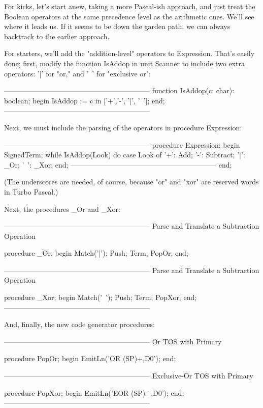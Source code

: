 \documentclass[float=false, crop=false]{standalone}
\begin{document}
For kicks, let's start anew, taking a more Pascal-ish approach, and just treat
the Boolean operators at the same precedence level as the arithmetic ones. We'll
see where it leads us. If it seems to be down the garden path, we can always
backtrack to the earlier approach.

For starters, we'll add the "addition-level" operators to Expression. That's
easily done; first, modify the function IsAddop in unit Scanner to include two
extra operators: '|' for "or," and '~' for "exclusive or":

\begin{code}
{--------------------------------------------------------------}
function IsAddop(c: char): boolean;
begin
	IsAddop := c in ['+','-', '|', '~'];
end;
{--------------------------------------------------------------}
\end{code}

Next, we must include the parsing of the operators in procedure Expression:

\begin{code}
{--------------------------------------------------------------}
procedure Expression;
begin
	SignedTerm;
	while IsAddop(Look) do
		case Look of
			'+': Add;
			'-': Subtract;
			'|': _Or;
			'~': _Xor;
		end;
{--------------------------------------------------------------}
end;
\end{code}

(The underscores are needed, of course, because "or" and "xor" are reserved
words in Turbo Pascal.)

Next, the procedures _Or and _Xor:

\begin{code}
{--------------------------------------------------------------}
{ Parse and Translate a Subtraction Operation }

procedure _Or;
begin
	Match('|');
	Push;
	Term;
	PopOr;
end;

{--------------------------------------------------------------}
{ Parse and Translate a Subtraction Operation }

procedure _Xor;
begin
	Match('~');
	Push;
	Term;
	PopXor;
end;
{--------------------------------------------------------------}
\end{code}

And, finally, the new code generator procedures:

\begin{code}
{--------------------------------------------------------------}
{ Or TOS with Primary }

procedure PopOr;
begin
	EmitLn('OR (SP)+,D0');
end;

{--------------------------------------------------------------}
{ Exclusive-Or TOS with Primary }

procedure PopXor;
begin
	EmitLn('EOR (SP)+,D0');
end;
{--------------------------------------------------------------}
\end{code}
\end{document}

